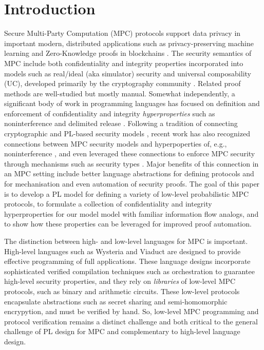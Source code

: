 \section{Introduction}

Secure Multi-Party Computation (MPC) protocols support data privacy in
important modern, distributed applications such as privacy-preserving
machine learning \cite{li2021privacy, knott2021crypten,
  koch2020privacy, liu2020privacy} and Zero-Knowledge proofs in
blockchains \cite{ishai2009zero, lu2019honeybadgermpc,
  gao2022symmeproof, tomaz2020preserving}. The security semantics of
MPC include both confidentiality and integrity properties incorporated
into models such as real/ideal (aka simulator) security and universal
composability (UC), developed primarily by the cryptography community
\cite{evans2018pragmatic}.  Related proof methods are well-studied
\cite{Lindell2017} but mostly manual. Somewhat independently, a
significant body of work in programming languages has focused on
definition and enforcement of confidentiality and integrity
\emph{hyperproperties} \cite{10.5555/1891823.1891830} such as
noninterference and delimited release
\cite{sabelfeld2009declassification}. Following a tradition of
connecting cryptographic and PL-based security models
\cite{10.1007/3-540-44929-9_1,10.1145/3571740}, recent work has also
recognized connections between MPC security models and hyperpoperties
of, e.g., noninterference \cite{8429300}, and even leveraged these
connections to enforce MPC security through mechanisms such as
security types \cite{10.1145/3453483.3454074}. Major benefits of this
connection in an MPC setting include better language abstractions for
defining protocols and for mechanisation and even automation of
security proofs.  The goal of this paper is to develop a PL model for
defining a variety of low-level probabilistic MPC protocols, to
formulate a collection of confidentiality and integrity
hyperproperties for our model model with familiar information flow
analogs, and to show how these properties can be leveraged for
improved proof automation.

The distinction between high- and low-level languages for MPC is
important. High-level languages such as Wysteria
\cite{rastogi2014wysteria} and Viaduct \cite{10.1145/3453483.3454074}
are designed to provide effective programming of full
applications. These language designs incorporate sophisticated
verified compilation techniques such as orchestration
\cite{viaduct-UC} to guarantee high-level security properties, and
they rely on \emph{libraries} of low-level MPC protocols, such as
binary and arithmetic circuits. These low-level protocols encapsulate
abstractions such as secret sharing and semi-homomorphic encrypytion,
and must be verified by hand. So, low-level MPC
programming and protocol verification remains a distinct challenge and both
critical to the general challenge of PL design for MPC and
complementary to high-level language design.

